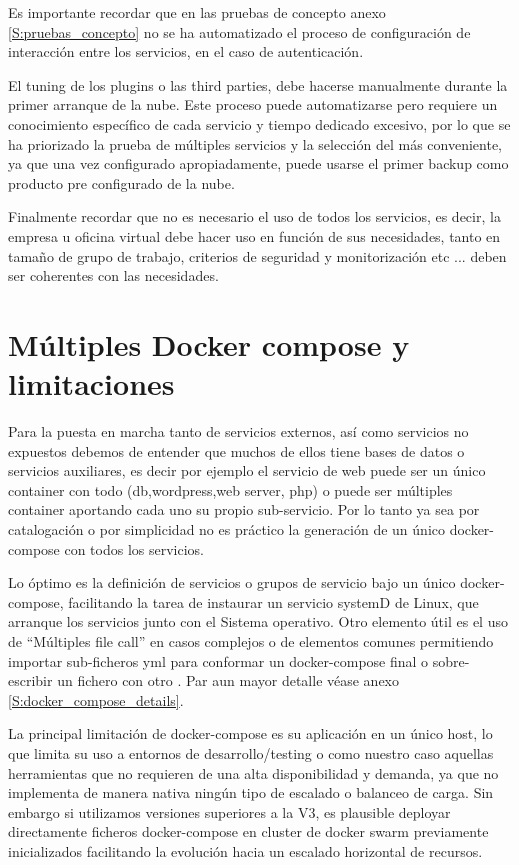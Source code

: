 Es importante recordar que en las pruebas de concepto anexo \ref{S:pruebas_concepto} no se ha automatizado el proceso de configuración de interacción entre los servicios, en el caso de autenticación. 

El tuning de los plugins o las third parties, debe hacerse manualmente durante la primer arranque de la nube. Este proceso puede automatizarse pero requiere un conocimiento específico de cada servicio y tiempo dedicado excesivo, por lo que se ha priorizado la prueba de múltiples servicios y la selección del más conveniente, ya que una vez configurado apropiadamente, puede usarse el primer backup como producto pre configurado de la nube. 

Finalmente recordar que no es necesario el uso de todos los servicios, es decir, la empresa u oficina virtual debe hacer uso en función de sus necesidades, tanto en tamaño de grupo de trabajo, criterios de seguridad y monitorización etc ... deben ser coherentes con las necesidades.
\clearpage

\section{Múltiples Docker compose y limitaciones}
Para la puesta en marcha tanto de servicios externos, así como servicios no expuestos debemos de entender que muchos de ellos tiene bases de datos o servicios auxiliares, es decir por ejemplo el servicio de web puede ser un único container con todo (db,wordpress,web server, php) o puede ser múltiples container aportando cada uno su propio sub-servicio. Por lo tanto ya sea por catalogación o por simplicidad no es práctico la generación de un único docker-compose con todos los servicios. 

Lo óptimo es la definición de servicios o grupos de servicio bajo un único docker-compose, facilitando la tarea de instaurar un servicio systemD\cite{c_docker_compose_systemD} de Linux, que arranque los servicios junto con el Sistema operativo. Otro elemento útil es el uso de “Múltiples file call”\cite{c_docker_compose_multiples} en casos complejos o de elementos comunes permitiendo importar sub-ficheros yml para conformar un docker-compose final o sobre-escribir un fichero con otro \cite{c_docker_compose_override}. Par aun mayor detalle véase anexo \ref{S:docker_compose_details}.

La principal limitación de docker-compose es su aplicación en un único host, lo que limita su uso a entornos de desarrollo/testing o como nuestro caso aquellas herramientas que no requieren de una alta disponibilidad y demanda, ya que no implementa de manera nativa ningún tipo de escalado o balanceo de carga. Sin embargo si utilizamos versiones superiores a la V3, es plausible deployar directamente ficheros docker-compose en cluster de docker swarm previamente inicializados facilitando la evolución hacia un escalado horizontal de recursos.

